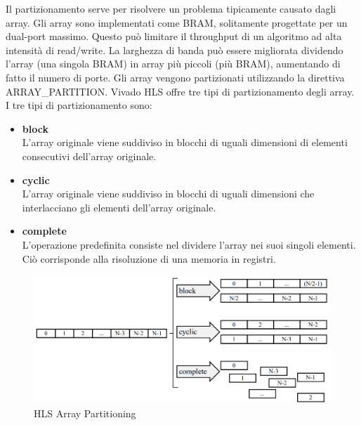 Il partizionamento serve per risolvere un problema tipicamente causato dagli array. Gli array sono implementati come BRAM, solitamente progettate per un dual-port massimo. Questo può limitare il throughput di un algoritmo ad alta intensità di read/write. La larghezza di banda può essere migliorata dividendo l'array (una singola BRAM) in array più piccoli (più BRAM), aumentando di fatto il numero di porte. Gli array vengono partizionati utilizzando la direttiva ARRAY\_PARTITION. Vivado HLS offre tre tipi di partizionamento degli array. I tre tipi di partizionamento sono:
\begin{itemize}
	\item \textbf{block}\\L'array originale viene suddiviso in blocchi di uguali dimensioni di elementi consecutivi dell'array originale.
	\item \textbf{cyclic}\\L'array originale viene suddiviso in blocchi di uguali dimensioni che interlacciano gli elementi dell'array originale.
	\item \textbf{complete}\\L'operazione predefinita consiste nel dividere l'array nei suoi singoli elementi. Ciò corrisponde alla risoluzione di una memoria in registri.
\end{itemize}

\begin{figure}[H]
	\centering
	\includegraphics[width=1\textwidth]{introduction/partitioning.png}
	\caption{HLS Array Partitioning}
\end{figure}